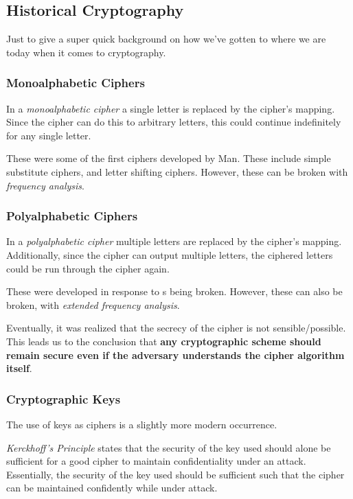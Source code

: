 \subsection{Historical Cryptography}\label{subsec:Historical_Cryptography}
Just to give a super quick background on how we've gotten to where we are today when it comes to cryptography.

\subsubsection{Monoalphabetic Ciphers}\label{subsubsec:Monoalphabetic_Ciphers}
\begin{definition}\label{def:Monoalphabetic_Cipher}
  In a \emph{monoalphabetic cipher} a single letter is replaced by the cipher's mapping.
  Since the cipher can do this to arbitrary letters, this could continue indefinitely for any single letter.

  These were some of the first ciphers developed by Man.
  These include simple substitute ciphers, and letter shifting ciphers.
  However, these can be broken with \emph{frequency analysis}.
\end{definition}

\subsubsection{Polyalphabetic Ciphers}\label{subsubsec:Polyalphabetic_Ciphers}
\begin{definition}\label{def:Polyalphabetic_Cipher}
  In a \emph{polyalphabetic cipher} multiple letters are replaced by the cipher's mapping.
  Additionally, since the cipher can output multiple letters, the ciphered letters could be run through the cipher again.

  These were developed in response to s being broken.
  However, these can also be broken, with \emph{extended frequency analysis}.
\end{definition}

Eventually, it was realized that the secrecy of the cipher is not sensible/possible.
This leads us to the conclusion that \textbf{any cryptographic scheme should remain secure even if the adversary understands the cipher algorithm itself}.

\subsubsection{Cryptographic Keys}\label{subsubsec:Cryptographic_Keys}
The use of keys as ciphers is a slightly more modern occurrence.
\begin{definition}\label{def:Kerckhoffs_Principle}
  \emph{Kerckhoff's Principle} states that the security of the key used should alone be sufficient for a good cipher to maintain confidentiality under an attack.
  Essentially, the security of the key used should be sufficient such that the cipher can be maintained confidently while under attack.
\end{definition}

